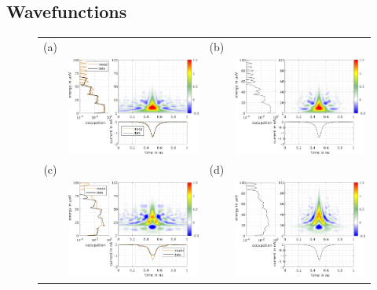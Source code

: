 \subsection{Wavefunctions}

\begin{figure}[hptb]
	\begin{center}
		\begin{tabular}{c c c c}
			(a) & & (b) &  \\ 
			
			& \includegraphics[width = 6.5cm]{./chap1/wannierwigData_leviton_40ps_1e_51mK_Projected_Gradient_Method-el-0} &
			& \includegraphics[width = 6.5cm]{./chap1/wannierwigTheory_leviton_40ps-el-0} \\
			(c) & & (d) &  \\
			& \includegraphics[width = 6.5cm]{./chap1/wannierwigData_leviton_40ps_1e_51mK_Projected_Gradient_Method-el-1} &
			& \includegraphics[width = 6.5cm]{./chap1/wannierwigTheory_leviton_40ps-el-1} \\
			

\end{tabular}
\end{center}
\end{figure}
